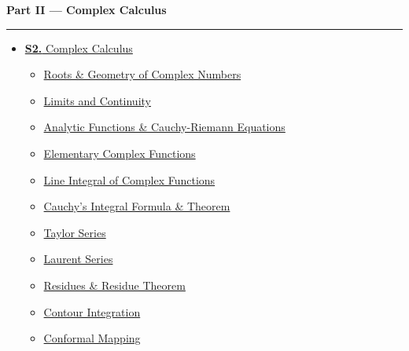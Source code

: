 \documentclass[12pt]{article}
\begin{document}
\begin{tcolorbox}[breakable,colback=cB!5,colframe=cB,boxrule=1pt,arc=5pt,
  left=8pt,right=8pt,top=8pt,bottom=8pt,before skip=4pt]
  {\large\bfseries\textcolor{cB}{Part II --- Complex Calculus}}\par\vspace{5pt}
  \textcolor{cB!40}{\rule{\linewidth}{0.4pt}}\par\vspace{3pt}
  \small\begin{itemize}[leftmargin=1.2em,itemsep=1pt,label={\textcolor{cB}{$\triangleright$}}]
    \item \hyperref[sec:S5]{\textbf{S2.} Complex Calculus}
      \begin{itemize}[leftmargin=1.5em,itemsep=0pt,label={\textcolor{cB}{$\cdot$}}]
        \item \hyperref[sub:s5-geometry]{Roots \& Geometry of Complex Numbers}
        \item \hyperref[sub:s5-limcont]{Limits and Continuity}
        \item \hyperref[sub:s5-analytic]{Analytic Functions \& Cauchy-Riemann Equations}
        \item \hyperref[sub:s5-elementary]{Elementary Complex Functions}
        \item \hyperref[sub:s5-lineint]{Line Integral of Complex Functions}
        \item \hyperref[sub:s5-cauchy]{Cauchy's Integral Formula \& Theorem}
        \item \hyperref[sub:s5-taylor]{Taylor Series}
        \item \hyperref[sub:s5-laurent]{Laurent Series}
        \item \hyperref[sub:s5-residue]{Residues \& Residue Theorem}
        \item \hyperref[sub:s5-contour]{Contour Integration}
        \item \hyperref[sub:s5-conformal]{Conformal Mapping}
      \end{itemize}
  \end{itemize}
\end{tcolorbox}

\vspace{6pt}
\end{document}

